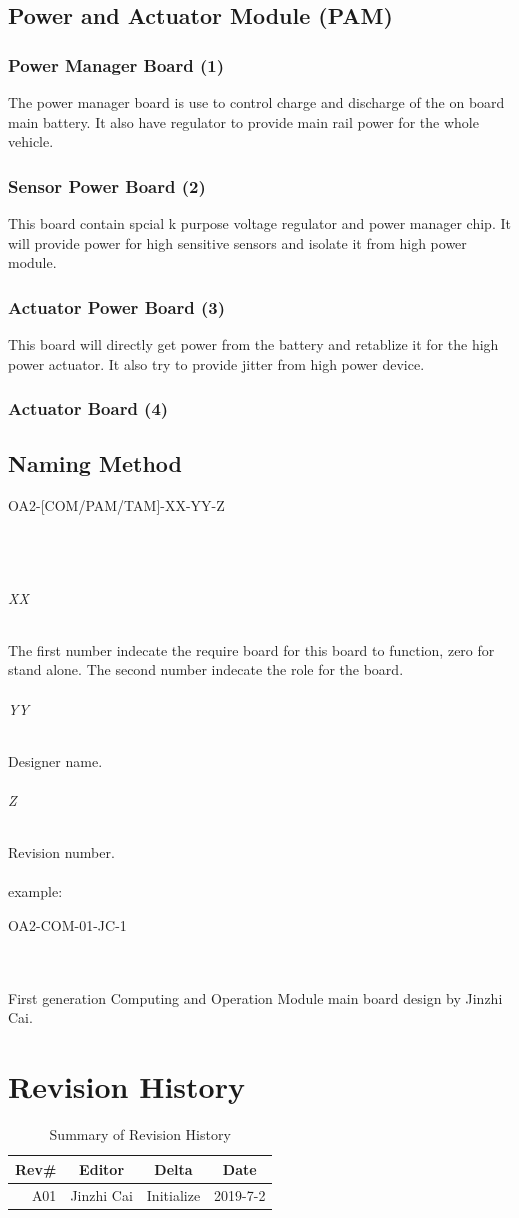 \documentclass[12pt,article]{memoir}
\begin{document}
\section{Power and Actuator Module (PAM)}
\subsection{Power Manager Board (1)}
The power manager board is use to control charge and discharge of the on board main battery. It also have regulator to provide main rail power for the whole vehicle.
\subsection{Sensor Power Board (2)}
This board contain spcial k purpose voltage regulator and power manager chip. It will provide power for high sensitive sensors and isolate it from high power module.
\subsection{Actuator Power Board (3)}
This board will directly get power from the battery and retablize it for the high power actuator. It also try to provide jitter from high power device.
\subsection{Actuator Board (4)}
\newpage
\section{Naming Method}
\begin{LARGE}
OA2-[COM/PAM/TAM]-XX-YY-Z
\end{LARGE}\\\\
\subparagraph{XX}
The first number indecate the require board for this board to function, zero for stand alone. The second number indecate the role for the board.
\subparagraph{YY}
Designer name.
\subparagraph{Z}
Revision number.\\\\
example: 
\begin{large}
OA2-COM-01-JC-1
\end{large}\\\\
First generation Computing and Operation Module main board design by Jinzhi Cai.
\newpage
\chapter{Revision History}
\begin{table}[H]
	\centering
	\begin{tabu}{r || c | c | c }
		Rev\# & Editor & Delta & Date\\ \hline
		A01 & Jinzhi Cai & Initialize  & 2019-7-2\\ \hline
	\end{tabu}
	\caption{Summary of Revision History}
	\label{tab:edatools}
\end{table}
\end{document}
